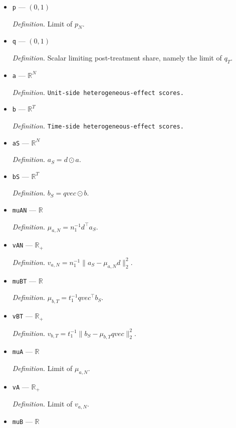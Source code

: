 \documentclass{article}
\begin{document}
\begin{itemize}
  \par\smallskip\noindent\emph{Definition.} \(q_T=t_1/T\).
  \item \texttt{p} --- \((0,1)\)
  \par\smallskip\noindent\emph{Definition.} Limit of \(p_N\).
  \item \texttt{q} --- \((0,1)\)
  \par\smallskip\noindent\emph{Definition.} Scalar limiting post-treatment share, namely the limit of \(q_T\).
  \item \texttt{a} --- \(\mathbb R^{N}\)
  \par\smallskip\noindent\emph{Definition.} \texttt{Unit-\allowbreak{}side heterogeneous-\allowbreak{}effect scores.}
  \item \texttt{b} --- \(\mathbb R^{T}\)
  \par\smallskip\noindent\emph{Definition.} \texttt{Time-\allowbreak{}side heterogeneous-\allowbreak{}effect scores.}
  \item \texttt{aS} --- \(\mathbb R^{N}\)
  \par\smallskip\noindent\emph{Definition.} \(a_S=d\odot a\).
  \item \texttt{bS} --- \(\mathbb R^{T}\)
  \par\smallskip\noindent\emph{Definition.} \(b_S=qvec\odot b\).
  \item \texttt{muAN} --- \(\mathbb R\)
  \par\smallskip\noindent\emph{Definition.} \(\mu_{a,N}=n_1^{-1}d^{\top}a_S\).
  \item \texttt{vAN} --- \(\mathbb R_{+}\)
  \par\smallskip\noindent\emph{Definition.} \(v_{a,N}=n_1^{-1}\|a_S-\mu_{a,N}d\|_2^2\).
  \item \texttt{muBT} --- \(\mathbb R\)
  \par\smallskip\noindent\emph{Definition.} \(\mu_{b,T}=t_1^{-1}qvec^{\top}b_S\).
  \item \texttt{vBT} --- \(\mathbb R_{+}\)
  \par\smallskip\noindent\emph{Definition.} \(v_{b,T}=t_1^{-1}\|b_S-\mu_{b,T}qvec\|_2^2\).
  \item \texttt{muA} --- \(\mathbb R\)
  \par\smallskip\noindent\emph{Definition.} Limit of \(\mu_{a,N}\).
  \item \texttt{vA} --- \(\mathbb R_{+}\)
  \par\smallskip\noindent\emph{Definition.} Limit of \(v_{a,N}\).
  \item \texttt{muB} --- \(\mathbb R\)

\end{itemize}
\end{document}
